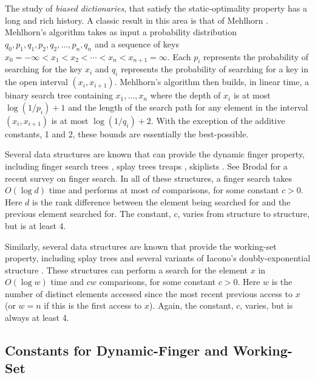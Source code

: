\documentclass{patmorin}
\let\oldmarginpar\marginpar
\renewcommand{\marginpar}[2][rectangle,draw,fill=yellow,rounded corners,text width=2.21cm]{%
        \oldmarginpar{%
        \tikz \node at (0,0) [#1]{#2};}%
        }
\newcommand{\note}[1]{\marginpar{\raggedright\footnotesize\nohyphens{#1}}}
\begin{document}
The study of \emph{biased dictionaries}, that satisfy the
static-optimality property has a long and rich history.  A classic
result in this area is that of Mehlhorn \cite{mehlhorn:best}.
Mehlhorn's algorithm takes as input a probability distribution
$q_0,p_1,q_1,p_2,q_2,\ldots,p_n,q_n$ and a sequence of keys
$x_0=-\infty<x_1<x_2<\cdots<x_n<x_{n+1}=\infty$.  Each $p_i$
represents the probability of searching for the key $x_i$ and $q_i$
represents the probability of searching for a key in the open interval
$(x_{i},x_{i+1})$. Mehlhorn's algorithm then builds, in linear time,
a binary search tree containing $x_1,\ldots,x_n$ where the depth of
$x_i$ is at most $\log (1/p_i)+1$ and the length of the search path
for any element in the interval $(x_i,x_{i+1})$ is at most $\log
(1/q_i)+2$. With the exception of the additive constants, 1 and 2,
these bounds are essentially the best-possible.  

Several data structures are known that can provide the dynamic
finger property, including finger search trees \cite{tarjan:xxx},
splay trees \cite{S} treaps \cite{sksk}, skiplists \cite{sksk}.
See Brodal \cite{brodal:finger} for a recent survey on finger search.
In all of these structures, a finger search takes $O(\log d)$ time and
performs at most $cd$ comparisons, for some constant $c>0$.  Here $d$
is the rank difference between the element being searched for and the
previous element searched for.  The constant, $c$, varies from structure
to structure, but is at least $4$.\note{is this true?}

Similarly, several data structures are known that provide the working-set
property, including splay trees \cite{X} and several variants of Iacono's
doubly-exponential structure \cite{X}.  These structures can perform a
search for the element $x$ in $O(\log w)$ time and $cw$ comparisons,
for some constant $c>0$. Here $w$ is the number of distinct elements
accessed since the most recent previous access to $x$ (or $w=n$ if this
is the first access to $x$).  Again, the constant, $c$, varies, but is
always at least 4.

\subsection{Constants for Dynamic-Finger and Working-Set}
\end{document}
